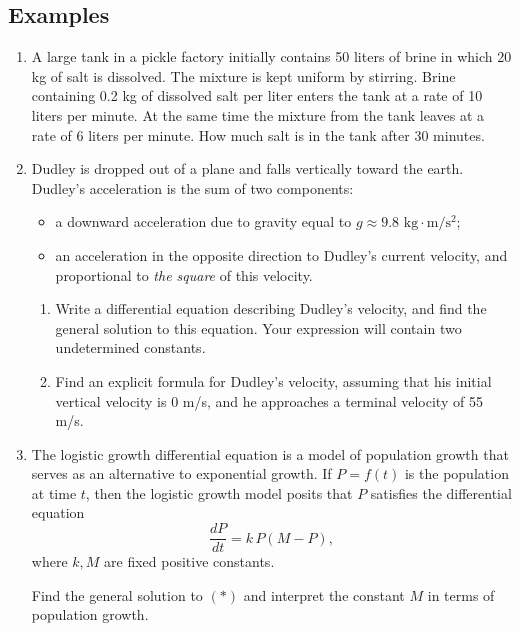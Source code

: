 \subsection*{Examples}
\begin{enumerate}
  \item A large tank in a pickle factory initially contains 50 liters of brine in which 20 kg of salt is dissolved. The mixture is kept uniform by stirring. Brine containing 0.2 kg of dissolved salt per liter enters the tank at a rate of 10 liters per minute. At the same time the mixture from the tank leaves at a rate of 6 liters per minute. How much salt is in the tank after 30 minutes.
  \item Dudley is dropped out of a plane and falls vertically toward the earth. Dudley's acceleration is the sum of two components:
  \begin{itemize}[itemsep=0pt, topsep=0pt]
    \item a downward acceleration due to gravity equal to $g\approx 9.8\text{ kg}\cdot \text{m}/\text{s}^2$;
    \item an acceleration in the opposite direction to Dudley's current velocity, and proportional to {\em the square} of this velocity.
  \end{itemize}
  \begin{enumerate}
    \item Write a differential equation describing Dudley's velocity, and find the general solution to this equation. Your expression will contain two undetermined constants.
    \item Find an explicit formula for Dudley's velocity, assuming that his initial vertical velocity is 0 m/s, and he approaches a terminal velocity of 55 m/s.
  \end{enumerate}
  \item The logistic growth differential equation is a model of population growth that serves as an alternative to exponential growth. If $P=f(t)$ is the population at time $t$, then the logistic growth model posits that $P$ satisfies the differential equation
  \[
  \frac{dP}{dt}=k\, P(M-P), \tag{$*$}
  \]
  where $k, M$ are fixed positive constants.

  Find the general solution to $(*)$ and interpret the constant $M$ in terms of population growth.
\end{enumerate}





\newpage
